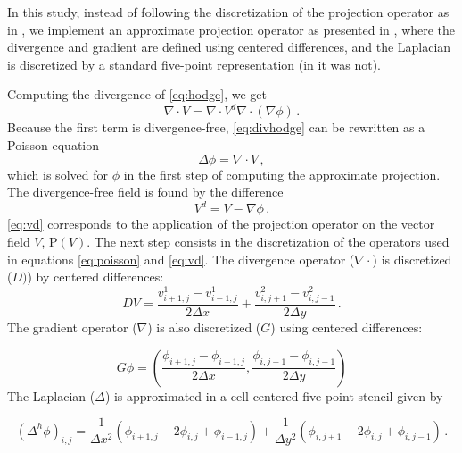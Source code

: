 \documentclass{article}
\begin{document}
In this study, instead of following the discretization of the projection operator as in \cite{Bell1991a}, we implement an approximate projection operator as presented in \cite{Lai1993a}, where the divergence and gradient are defined using centered differences, and the Laplacian is discretized by a standard five-point representation (in \cite{Bell1991a} it was not).

Computing the divergence of \eqref{eq:hodge}, we get
\begin{equation}
\label{eq:divhodge}
	\nabla \cdot V = \nabla \cdot V^d \nabla \cdot (\nabla \phi) \,.
\end{equation}
Because the first term is divergence-free, \eqref{eq:divhodge} can be rewritten as a Poisson equation
\begin{equation}
\label{eq:poisson}
	\Delta \phi = \nabla \cdot V  \,,
\end{equation}
which is solved for $\phi$ in the first step of computing the approximate projection. The divergence-free field is found by the difference
\begin{equation}
\label{eq:vd}
	V^d = V - \nabla \phi \,.
\end{equation}
\autoref{eq:vd} corresponds to the application of the projection operator on the vector field $V$, $\mathrm{P}(V)$.
The next step consists in the discretization of the operators used in equations \eqref{eq:poisson} and \eqref{eq:vd}. The divergence operator ($\nabla \cdot$) is discretized ($D)$) by centered differences:
\begin{equation}
\label{eq:discdiv}
	DV = \frac{v_{i + 1, j}^1 - v_{i - 1, j}^1}{2 \Delta x} + \frac{v_{i, j + 1}^2 - v_{i, j - 1}^2}{2 \Delta y} \,.
\end{equation}
The gradient operator ($\nabla$) is also discretized ($G$) using centered differences:

\begin{equation}
\label{eq:discgrad}
	G\phi = \left( \frac{\phi_{i + 1, j} - \phi_{i - 1, j}}{2 \Delta x}, \frac{\phi_{i, j + 1} - \phi_{i, j - 1}}{2 \Delta y} \right)
\end{equation}
The Laplacian ($\Delta$) is approximated in a cell-centered five-point stencil given by

\begin{equation}
\label{eq:disclap}
	(\Delta^h \phi)_{i, j} = \frac{1}{\Delta x^2} (\phi_{i + 1, j} - 2 \phi_{i, j} + \phi_{i - 1, j}) + \frac{1}{\Delta y^2} (\phi_{i, j + 1} - 2 \phi_{i, j} + \phi_{i, j - 1}) \,.
\end{equation}
\end{document}
